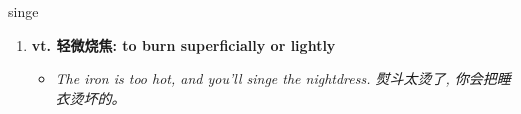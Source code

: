 
\begin{frame}
{\huge singe}
\begin{center}
\begin{enumerate}\Large
  \item \textbf{vt. 轻微烧焦: to burn superficially or lightly}
  \begin{itemize}
    \item \em{\Large{The iron is too hot, and you'll singe the nightdress. 熨斗太烫了, 你会把睡衣烫坏的。}}
  \end{itemize}
\end{enumerate}
\end{center}
\end{frame}
